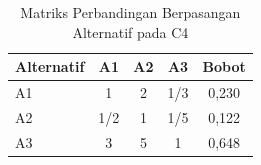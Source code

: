 \begin{table}[h]
\centering
\caption{Matriks Perbandingan Berpasangan Alternatif pada C4}
\label{tab:ahp-alt-c4}
\begin{tabular}{|l|c|c|c|c|}
\hline
\textbf{Alternatif} & \textbf{A1} & \textbf{A2} & \textbf{A3} & \textbf{Bobot} \\
\hline
A1             & 1     & 2     & 1/3   & 0,230 \\
A2             & 1/2   & 1     & 1/5   & 0,122 \\
A3             & 3     & 5     & 1     & 0,648 \\
\hline
\end{tabular}
\end{table}